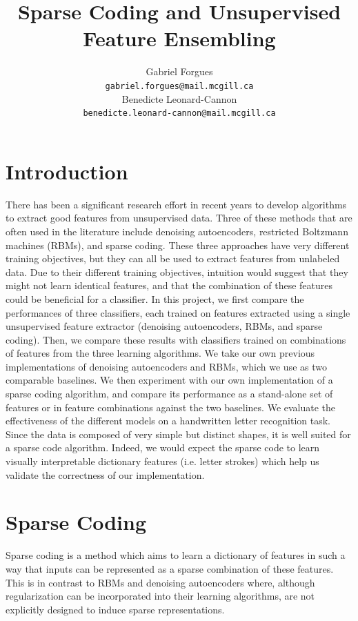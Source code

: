\documentclass{article} %
\title{Sparse Coding and Unsupervised Feature Ensembling}
\author{
Gabriel Forgues \\
\texttt{gabriel.forgues@mail.mcgill.ca} \\
\And 
Benedicte Leonard-Cannon \\
\texttt{benedicte.leonard-cannon@mail.mcgill.ca} \\
}
\begin{document}
\maketitle

\section{Introduction}
There has been a significant research effort in recent years to develop algorithms to extract good features from unsupervised data. Three of these methods that are often used in the literature include denoising autoencoders, restricted Boltzmann machines (RBMs), and sparse coding. These three approaches have very different training objectives, but they can all be used to extract features from unlabeled data. Due to their different training objectives, intuition would suggest that they might not learn identical features, and that the combination of these features could be beneficial for a classifier. In this project, we first compare the performances of three classifiers, each trained on features extracted using a single unsupervised feature extractor (denoising autoencoders, RBMs, and sparse coding). Then, we compare these results with classifiers trained on combinations of features from the three learning algorithms. We take our own previous implementations of denoising autoencoders and RBMs, which we use as two comparable baselines. We then experiment with our own implementation of a sparse coding algorithm, and compare its performance as a stand-alone set of features or in feature combinations against the two baselines. We evaluate the effectiveness of the different models on a handwritten letter recognition task. Since the data is composed of very simple but distinct shapes, it is well suited for a sparse code algorithm. Indeed, we would expect the sparse code to learn visually interpretable dictionary features (i.e. letter strokes) which help us validate the correctness of our implementation.

\section{Sparse Coding}
Sparse coding is a method which aims to learn a dictionary of features in such a way that inputs can be represented as a sparse combination of these features. This is in contrast to RBMs and denoising autoencoders where, although regularization can be incorporated into their learning algorithms, are not explicitly designed to induce sparse representations.
\end{document}
